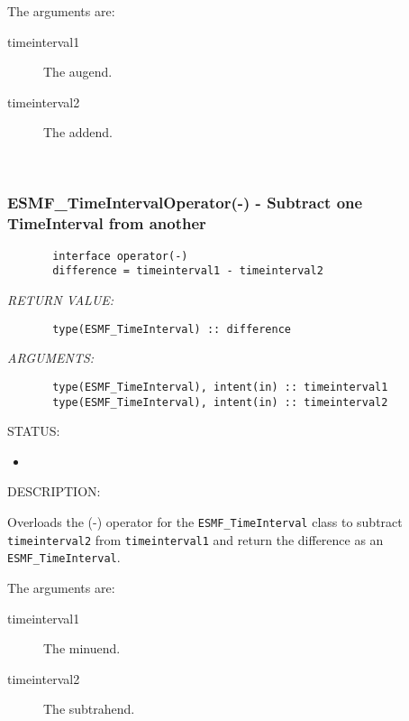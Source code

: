        The arguments are:
       \begin{description}
       \item[timeinterval1]
            The augend.
       \item[timeinterval2]
            The addend.
       \end{description}
    
 
\mbox{}\hrulefill\ 
 
\subsubsection [ESMF\_TimeIntervalOperator(-)] {ESMF\_TimeIntervalOperator(-) - Subtract one TimeInterval from another}


  
\begin{verbatim}       interface operator(-)
       difference = timeinterval1 - timeinterval2\end{verbatim}{\em RETURN VALUE:}
\begin{verbatim}       type(ESMF_TimeInterval) :: difference\end{verbatim}{\em ARGUMENTS:}
\begin{verbatim}       type(ESMF_TimeInterval), intent(in) :: timeinterval1
       type(ESMF_TimeInterval), intent(in) :: timeinterval2\end{verbatim}
{\sf STATUS:}
   \begin{itemize}
   \item{}
   \end{itemize}
  
{\sf DESCRIPTION:\\ }


       \begin{sloppypar}
       Overloads the (-) operator for the {\tt ESMF\_TimeInterval} class to
       subtract {\tt timeinterval2} from {\tt timeinterval1} and return
       the difference as an {\tt ESMF\_TimeInterval}.
       \end{sloppypar}
  
       The arguments are:
       \begin{description}
       \item[timeinterval1]
            The minuend.
       \item[timeinterval2]
            The subtrahend.
       \end{description}
   
